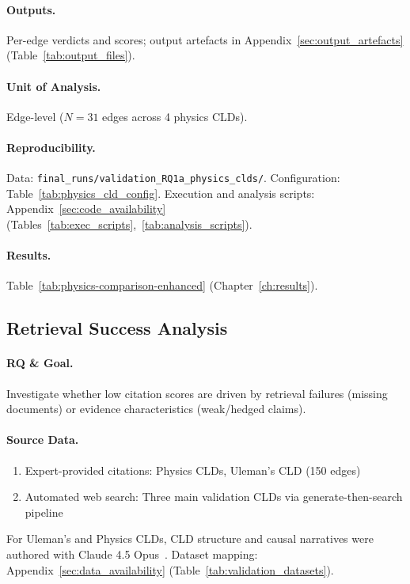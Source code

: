 \paragraph{Outputs.}
Per-edge verdicts and scores; output artefacts in Appendix~\ref{sec:output_artefacts} (Table~\ref{tab:output_files}).

\paragraph{Unit of Analysis.}
Edge-level ($N=31$ edges across 4 physics CLDs).

\paragraph{Reproducibility.}
Data: \texttt{final\_runs/validation\_RQ1a\_physics\_clds/}. Configuration: Table~\ref{tab:physics_cld_config}. Execution and analysis scripts: Appendix~\ref{sec:code_availability} (Tables~\ref{tab:exec_scripts},~\ref{tab:analysis_scripts}).

\paragraph{Results.}
Table~\ref{tab:physics-comparison-enhanced} (Chapter~\ref{ch:results}).

\subsection{Retrieval Success Analysis}
\label{sec:retrieval_success}

\paragraph{RQ \& Goal.}
Investigate whether low citation scores are driven by retrieval failures (missing documents) or evidence characteristics (weak/hedged claims).

\paragraph{Source Data.}
\begin{enumerate}[noitemsep]
    \item Expert-provided citations: Physics CLDs, Uleman's CLD (150 edges)
    \item Automated web search: Three main validation CLDs via generate-then-search pipeline
\end{enumerate}
For Uleman's and Physics CLDs, CLD structure and causal narratives were authored with Claude 4.5 Opus~\cite{anthropic2025claude45opus}. Dataset mapping: Appendix~\ref{sec:data_availability} (Table~\ref{tab:validation_datasets}).

